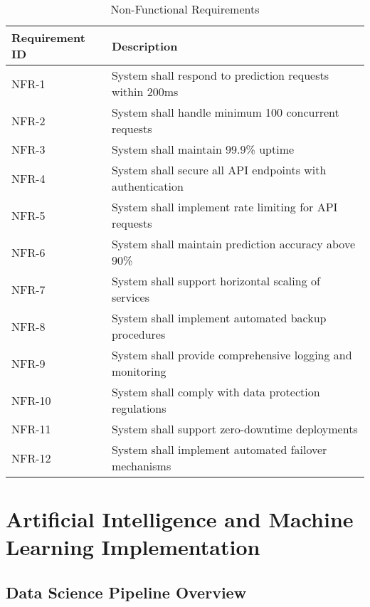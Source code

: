 \documentclass[12pt,a4paper]{report}
\begin{document}
\begin{table}[H]
\caption{Non-Functional Requirements}
\begin{tabularx}{\textwidth}{|>{\hspace{0.5em}}p{}|>{\hspace{0.5em}}X|}
\hline
\textbf{Requirement ID} & \textbf{Description} \\
\hline
NFR-1 & System shall respond to prediction requests within 200ms \\
\hline
NFR-2 & System shall handle minimum 100 concurrent requests \\
\hline
NFR-3 & System shall maintain 99.9\% uptime \\
\hline
NFR-4 & System shall secure all API endpoints with authentication \\
\hline
NFR-5 & System shall implement rate limiting for API requests \\
\hline
NFR-6 & System shall maintain prediction accuracy above 90\% \\
\hline
NFR-7 & System shall support horizontal scaling of services \\
\hline
NFR-8 & System shall implement automated backup procedures \\
\hline
NFR-9 & System shall provide comprehensive logging and monitoring \\
\hline
NFR-10 & System shall comply with data protection regulations \\
\hline
NFR-11 & System shall support zero-downtime deployments \\
\hline
NFR-12 & System shall implement automated failover mechanisms \\
\hline
\end{tabularx}
\end{table}

\chapter{Artificial Intelligence and Machine Learning Implementation}
\section{Data Science Pipeline Overview}
\end{document}
